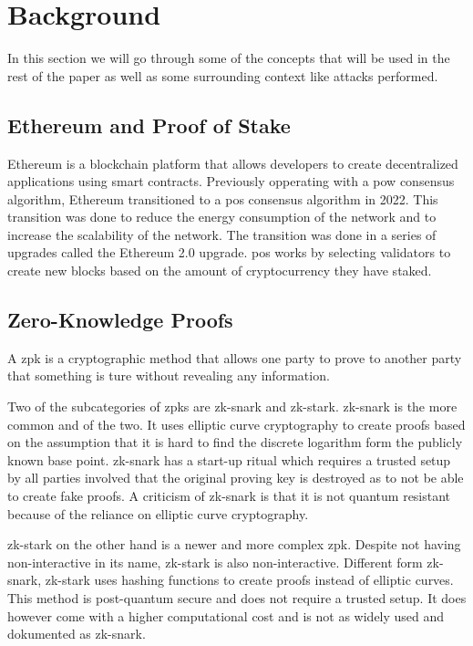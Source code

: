 
\section{Background}\label{sec:background}
In this section we will go through some of the concepts that will be used in the rest of the paper as well as some surrounding context like attacks performed.

\subsection{Ethereum and Proof of Stake}\label{subsec:ethereum-and-proof-of-stake}
Ethereum is a blockchain platform that allows developers to create decentralized applications using smart contracts.
Previously opperating with a \gls{pow} consensus algorithm, Ethereum transitioned to a \gls{pos} consensus algorithm in 2022.
This transition was done to reduce the energy consumption of the network and to increase the scalability of the network.
The transition was done in a series of upgrades called the Ethereum 2.0 upgrade.
\gls{pos} works by selecting validators to create new blocks based on the amount of cryptocurrency they have staked.

\subsection{Zero-Knowledge Proofs}\label{subsec:zero-knowledge-proofs}
A \gls{zpk} is a cryptographic method that allows one party to prove to another party that something is ture without revealing any information.

Two of the subcategories of \gls{zpk}s are \gls{zk-snark} and \gls{zk-stark}.
\gls{zk-snark} is the more common and of the two.
It uses elliptic curve cryptography to create proofs based on the assumption that it is hard to find the discrete logarithm form the publicly known base point.
\gls{zk-snark} has a start-up ritual which requires a trusted setup by all parties involved that the original proving key is destroyed as to not be able to create fake proofs.
A criticism of \gls{zk-snark} is that it is not quantum resistant because of the reliance on elliptic curve cryptography.

\gls{zk-stark} on the other hand is a newer and more complex \gls{zpk}.
Despite not having non-interactive in its name, \gls{zk-stark} is also non-interactive.
Different form \gls{zk-snark}, \gls{zk-stark} uses hashing functions to create proofs instead of elliptic curves.
This method is post-quantum secure and does not require a trusted setup.
It does however come with a higher computational cost and is not as widely used and dokumented as \gls{zk-snark}.

